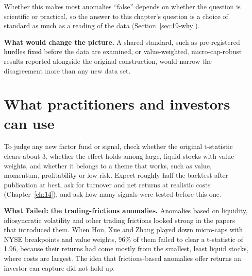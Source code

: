 Whether this makes most anomalies ``false'' depends on whether the question is scientific or practical, so the answer to this chapter's question is a choice of standard as much as a reading of the data (Section~\ref{sec:19-why}).

\textbf{What would change the picture.} A shared standard, such as pre-registered hurdles fixed before the data are examined, or value-weighted, micro-cap-robust results reported alongside the original construction, would narrow the disagreement more than any new data set.

\section{What practitioners and investors can use}
\label{sec:19-investors}

To judge any new factor fund or signal, check whether the original t-statistic clears about 3, whether the effect holds among large, liquid stocks with value weights, and whether it belongs to a theme that works, such as value, momentum, profitability or low risk. Expect roughly half the backtest after publication at best, ask for turnover and net returns at realistic costs (Chapter~\ref{ch:14}), and ask how many signals were tested before this one.

\begin{callout}
\textbf{What Failed: the trading-frictions anomalies.} Anomalies based on liquidity, idiosyncratic volatility and other trading frictions looked strong in the papers that introduced them. When Hou, Xue and Zhang played down micro-caps with NYSE breakpoints and value weights, 96\% of them failed to clear a t-statistic of 1.96, because their returns had come mostly from the smallest, least liquid stocks, where costs are largest. The idea that frictions-based anomalies offer returns an investor can capture did not hold up.
\end{callout}

\makeatletter
{}
\makeatother

